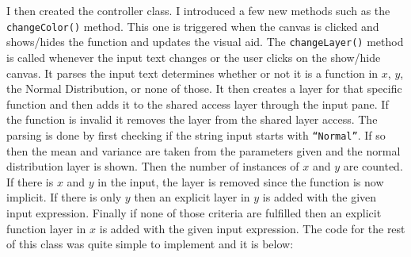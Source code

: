 \documentclass[../../../../main.tex]{subfiles}
\begin{document}
\newpage
I then created the controller class. I introduced a few new methods such as the \texttt{changeColor()} method. This one is triggered when the canvas is clicked and shows/hides the function and updates the visual aid. The \texttt{changeLayer()} method is called whenever the input text changes or the user clicks on the show/hide canvas. It parses the input text determines whether or not it is a function in $x$, $y$, the Normal Distribution, or none of those. It then creates a layer for that specific function and then adds it to the shared access layer through the input pane. If the function is invalid it removes the layer from the shared layer access. The parsing is done by first checking if the string input starts with \texttt{``Normal''}. If so then the mean and variance are taken from the parameters given and the normal distribution layer is shown. Then the number of instances of $x$ and $y$ are counted. If there is $x$ and $y$ in the input, the layer is removed since the function is now implicit. If there is only $y$ then an explicit layer in $y$ is added with the given input expression. Finally if none of those criteria are fulfilled then an explicit function layer in $x$ is added with the given input expression. The code for the rest of this class was quite simple to implement and it is below:
\end{document}
